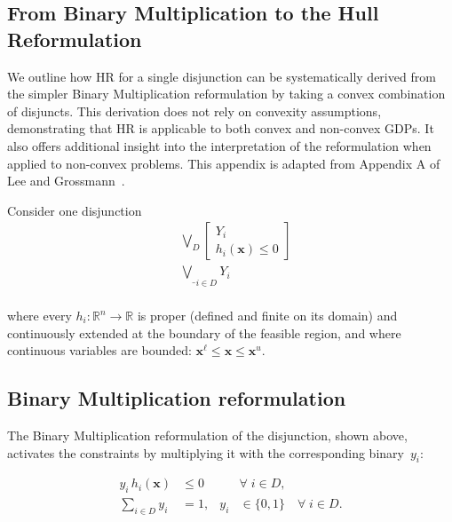 \documentclass[11pt]{article}
\begin{document}
\begin{appendices}
\normalsize

\vspace{-2ex}
\section{From Binary Multiplication to the Hull Reformulation}
\label{app:bm-to-hull}


We outline how HR for a single disjunction can be systematically derived from the simpler Binary Multiplication reformulation by taking a convex combination of disjuncts.
This derivation does not rely on convexity assumptions, demonstrating that HR is applicable to both convex and non-convex GDPs. 
It also offers additional insight into the interpretation of the reformulation when applied to non-convex problems.
This appendix is adapted from Appendix A of Lee and Grossmann~\cite{leeNewAlgorithmsNonlinear2000}.

\vspace{5pt}
Consider one disjunction
\begingroup
\begin{equation*}
\begin{aligned}
    & \bigvee_{D}
        \begin{bmatrix} 
            Y_{i} \\
            h_{i}(\mathbf{x}) \leq 0 
        \end{bmatrix}\\
    & \underset{i \in D}{\underline{\bigvee}} Y_{i}\\
\end{aligned}
\label{eq:Disjunction}
\end{equation*}
\endgroup

\noindent where every $h_i:\mathbb R^n\to\mathbb R$ is proper (defined and finite on its domain) and continuously
extended at the boundary of the feasible region, and where continuous variables are bounded:
$\mathbf x^{\ell}\le \mathbf x\le \mathbf x^{u}$.

\subsection{Binary Multiplication reformulation}
The Binary Multiplication reformulation of the disjunction, shown above, activates the constraints by multiplying it with the corresponding binary~$y_i$:

\begingroup
\begin{equation*}
\begin{aligned}
y_i\,h_i(\mathbf x) &\le 0 &&\forall\; i\in D,
\\
\sum_{i\in D} y_i &= 1,
& y_i &\in\{0,1\}\quad \forall\; i\in D.
\end{aligned}
\end{equation*}
\endgroup



\end{appendices}
\end{document}
